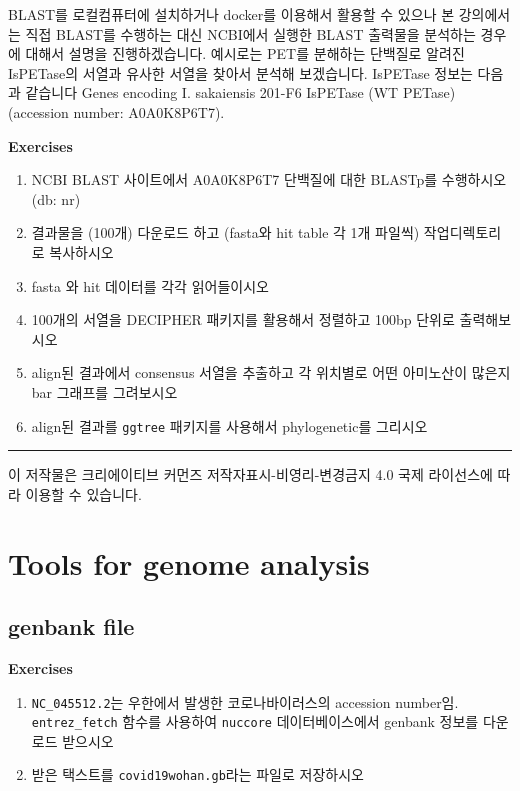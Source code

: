 \documentclass[
]{book}
\begin{document}
BLAST를 로컬컴퓨터에 설치하거나 docker를 이용해서 활용할 수 있으나 본 강의에서는 직접 BLAST를 수행하는 대신 NCBI에서 실행한 BLAST 출력물을 분석하는 경우에 대해서 설명을 진행하겠습니다. 예시로는 PET를 분해하는 단백질로 알려진 IsPETase의 서열과 유사한 서열을 찾아서 분석해 보겠습니다. IsPETase 정보는 다음과 같습니다 Genes encoding I. sakaiensis 201-F6 IsPETase (WT PETase) (accession number: A0A0K8P6T7).

\textbf{Exercises }

\begin{enumerate}
\def\labelenumi{\arabic{enumi})}
\item
  NCBI BLAST 사이트에서 A0A0K8P6T7 단백질에 대한 BLASTp를 수행하시오 (db: nr)
\item
  결과물을 (100개) 다운로드 하고 (fasta와 hit table 각 1개 파일씩) 작업디렉토리로 복사하시오
\item
  fasta 와 hit 데이터를 각각 읽어들이시오
\item
  100개의 서열을 DECIPHER 패키지를 활용해서 정렬하고 100bp 단위로 출력해보시오
\item
  align된 결과에서 consensus 서열을 추출하고 각 위치별로 어떤 아미노산이 많은지 bar 그래프를 그려보시오
\item
  align된 결과를 \texttt{ggtree} 패키지를 사용해서 phylogenetic를 그리시오
\end{enumerate}

\begin{center}\rule{0.5\linewidth}{0.5pt}\end{center}

이 저작물은 크리에이티브 커먼즈 저작자표시-비영리-변경금지 4.0 국제 라이선스에 따라 이용할 수 있습니다.

\hypertarget{tools-for-genome-analysis}{%
\chapter{Tools for genome analysis}\label{tools-for-genome-analysis}}

\hypertarget{genbank-file}{%
\section{genbank file}\label{genbank-file}}

\textbf{Exercises }

\begin{enumerate}
\def\labelenumi{\arabic{enumi}.}
\item
  \texttt{NC\_045512.2}는 우한에서 발생한 코로나바이러스의 accession number임. \texttt{entrez\_fetch} 함수를 사용하여 \texttt{nuccore} 데이터베이스에서 genbank 정보를 다운로드 받으시오
\item
  받은 택스트를 \texttt{covid19wohan.gb}라는 파일로 저장하시오
\end{enumerate}
\end{document}
